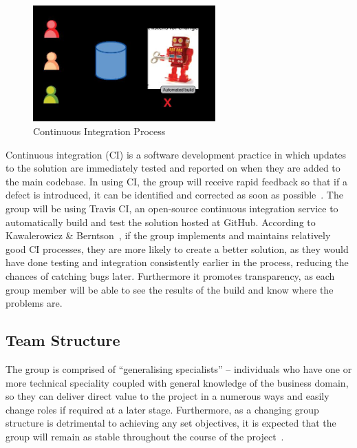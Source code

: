 \begin{figure}
  \centering
  \begin{minipage}{7cm}
    \centering
    \includegraphics[width=7cm]{inc/continuous_integration_process.jpg}
    \caption{Continuous Integration Process}
    \label{fig:continuous_integration_process}
  \end{minipage}
\end{figure}

Continuous integration (CI) is a software development practice in which updates to the solution are immediately tested and reported on when they are added to the main codebase. In using CI, the group will receive rapid feedback so that if a defect is introduced, it can be identified and corrected as soon as possible~\parencite{web:behaviour_driven_development}. The group will be using Travis CI, an open-source continuous integration service to automatically build and test the solution hosted at GitHub. According to Kawalerowicz \& Berntson~\parencite{book:ci_NET}, if the group implements and maintains relatively good CI processes, they are more likely to create a better solution, as they would have done testing and integration consistently earlier in the process, reducing the chances of catching bugs later. Furthermore it promotes transparency, as each group member will be able to see the results of the build and know where the problems are.

\subsection{Team Structure}

The group is comprised of ``generalising specialists'' -- individuals who have one or more technical speciality coupled with general knowledge of the business domain, so they can deliver direct value to the project in a numerous ways and easily change roles if required at a later stage. Furthermore, as a changing group structure is detrimental to achieving any set objectives, it is expected that the group will remain as stable throughout the course of the project~\parencite{book:agile_development}.

